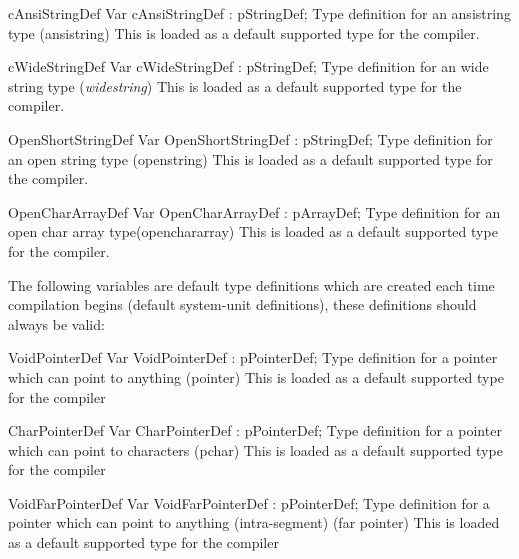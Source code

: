 \documentclass [a4paper,12pt]{article}
\begin{document}
\begin{variable}{cAnsiStringDef}
\Declaration
Var cAnsiStringDef : pStringDef;
\Description
Type definition for an ansistring type (\textsf{ansistring})
\Notes
This is loaded as a default supported type for the compiler.
\end{variable}

\begin{variable}{cWideStringDef}
\Declaration
Var cWideStringDef : pStringDef;
\Description
Type definition for an wide string type (\textsf{\textit{widestring}})
\Notes
This is loaded as a default supported type for the compiler.
\end{variable}

\begin{variable}{OpenShortStringDef}
\Declaration
Var OpenShortStringDef : pStringDef;
\Description
Type definition for an open string type (\textsf{openstring})
\Notes
This is loaded as a default supported type for the compiler.
\end{variable}

\begin{variable}{OpenCharArrayDef}
\Declaration
Var OpenCharArrayDef : pArrayDef;
\Description
Type definition for an open char array type(\textsf{openchararray})
\Notes
This is loaded as a default supported type for the compiler.
\end{variable}

The following variables are default type definitions which are created each
time compilation begins (default system-unit definitions), these definitions
should always be valid:

\begin{variable}{VoidPointerDef}
\Declaration
Var VoidPointerDef : pPointerDef;
\Description
Type definition for a pointer which can point to anything (\textsf{pointer})
\Notes
This is loaded as a default supported type for the compiler
\end{variable}

\begin{variable}{CharPointerDef}
\Declaration
Var CharPointerDef : pPointerDef;
\Description
Type definition for a pointer which can point to characters (\textsf{pchar})
\Notes
This is loaded as a default supported type for the compiler
\end{variable}

\begin{variable}{VoidFarPointerDef}
\Declaration
Var VoidFarPointerDef : pPointerDef;
\Description
Type definition for a pointer which can point to anything
(intra-segment) (\textsf{far pointer})
\Notes
This is loaded as a default supported type for the compiler
\end{variable}
\end{document}
